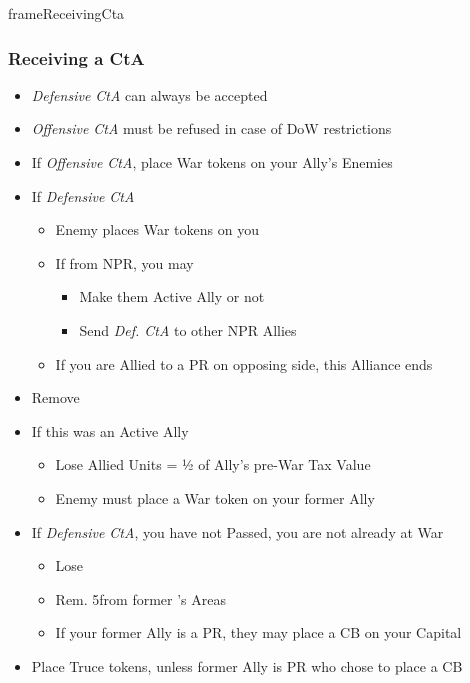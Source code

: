 \documentclass[10pt]{article}
\begin{document}
\begin{dynamiccontents*}{frameReceivingCta}
	\begin{multicols}{2}
		\subsubsection*{Receiving a CtA }
		\begin{itemize}
			\item \emph{Defensive CtA} can always be accepted
			\item \emph{Offensive CtA} must be refused in case of DoW restrictions
		\end{itemize}
		\begin{itemize}
			\item If \emph{Offensive CtA}, place War tokens on your Ally's Enemies
			\item If \emph{Defensive CtA}
			\begin{itemize}
				\item Enemy places War tokens on you
				\item If from NPR, you may
				\begin{itemize}
					\item Make them Active Ally or not
					\item Send \emph{Def. CtA} to other NPR Allies
				\end{itemize}
				\item If you are Allied to a PR on opposing side, this Alliance ends
			\end{itemize}
		\end{itemize}
		\begin{itemize}
			\item Remove \alliance
			\item If this was an Active Ally
			\begin{itemize}
				\item Lose Allied Units = ½ of Ally's pre-War Tax Value
				\item Enemy must place a War token on your former Ally
			\end{itemize}
			\item If \emph{Defensive CtA},  you have not Passed,  you are not already at War
			\begin{itemize}
				\item Lose 
				\item Rem. 5\influence from former \ally's Areas
				\item If your former Ally is a PR, they may place a CB on your Capital
			\end{itemize}
			\item Place Truce tokens, unless former Ally is PR who chose to place a CB
		\end{itemize}
	\end{multicols}
\end{dynamiccontents*}
\end{document}
